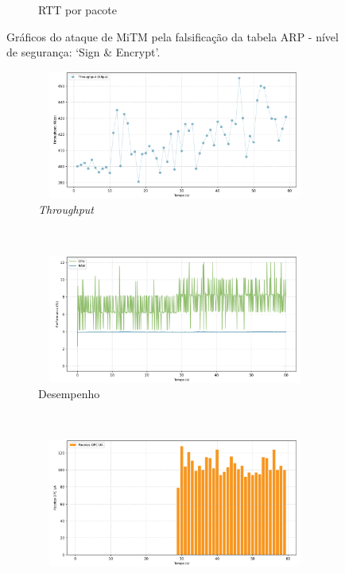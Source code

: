 \begin{apendicesenv}
\begin{figure}[htbp!]
\begin{subfigure}[t]{0.5\textwidth}
        \caption{RTT por pacote}
    \end{subfigure}%
    \label{fig:2-mitm_arp}
    \caption{Gráficos do ataque de MiTM pela falsificação da tabela ARP - nível de segurança: `Sign \& Encrypt'.}
\end{figure}

\begin{figure}[htbp!]
    \centering
    \begin{subfigure}[t]{0.5\textwidth}
        \centering
        \includegraphics[width=1\textwidth, height=120pt]{USPSC-img/output/cropped/0-mitm_port-tput.png}
        \caption{\textit{Throughput}}
    \end{subfigure}%
    ~ 
    \begin{subfigure}[t]{0.5\textwidth}
        \centering
        \includegraphics[width=1\textwidth, height=120pt]{USPSC-img/output/cropped/0-mitm_port-perf.png}
        \caption{Desempenho}
    \end{subfigure}%
    \\
    \begin{subfigure}[t]{0.5\textwidth}
        \centering
        \includegraphics[width=1\textwidth, height=120pt]{USPSC-img/output/cropped/0-mitm_port-pack.png}

\end{subfigure}
\end{figure}
\end{apendicesenv}
